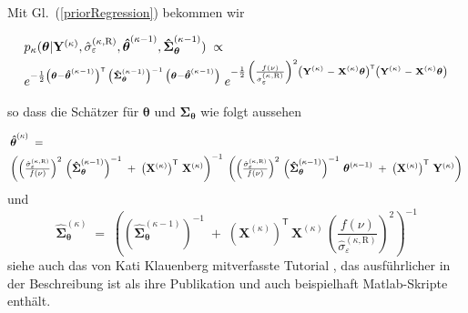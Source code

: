 Mit Gl.~(\ref{priorRegression}) bekommen wir
\begin{equation}
\arraycolsep=2.0pt\def\arraystretch{2.0}
\begin{array}{l}
p_{\kappa}(\boldsymbol{\theta}| \mathbf{Y}^{(\kappa)}, \hat \sigma_{\varepsilon}^{(\kappa,\mathrm{R})},  \boldsymbol{\hat \theta}^{(\kappa-1)},  \boldsymbol{\hat \Sigma}^{(\kappa-1)}_{\boldsymbol{\theta}}) \; \propto \\
e^{-\frac{1}{2}
	\left(\boldsymbol{\theta} - \boldsymbol{\hat \theta}^{(\kappa-1)} \right)^\mathsf{T} \,
	\left(\boldsymbol{\hat \Sigma}_{\boldsymbol{\theta}}^{(\kappa-1)}\right)^{-1} \, \left(\boldsymbol{\theta} - \boldsymbol{\hat \theta}^{(\kappa-1)} \right)} \;
e^{- \frac{1}{2} \, \left(\frac{f(\nu)}{\hat \sigma_{\varepsilon}^{(\kappa,\mathrm{R})}}\right)^2
	\left(\mathbf{Y}^{(\kappa)} \; - \;  \mathbf{X}^{(\kappa)} \boldsymbol{\theta} \right)^\mathsf{T}
	\left(\mathbf{Y}^{(\kappa)} \; - \;  \mathbf{X}^{(\kappa)} \boldsymbol{\theta} \right)}
\end{array}
\end{equation}
so dass die Schätzer für $\boldsymbol{\theta}$ und $\boldsymbol{\Sigma}_{\boldsymbol{\theta}}$
wie folgt aussehen
\begin{equation}
\arraycolsep=2.0pt\def\arraystretch{2.0}
\begin{array}{l}
\boldsymbol{\hat \theta}^{(\kappa)} \; = \; \\
\left(
\left(\frac{\hat \sigma_{\varepsilon}^{(\kappa,\mathrm{R})}}{f(\nu)}\right)^2 \,
\left(\boldsymbol{\hat \Sigma}_{\boldsymbol{\theta}}^{(\kappa-1)}\right)^{-1}
\; + \;
\left(\mathbf{X}^{(\kappa)}\right)^\mathsf{T} \, \mathbf{X}^{(\kappa)}
\right)^{-1} \;
\left(
\left( \frac{\hat \sigma_{\varepsilon}^{(\kappa,\mathrm{R})}}{f(\nu)}\right)^2 \,
\left(\boldsymbol{\hat \Sigma}_{\boldsymbol{\theta}}^{(\kappa-1)}\right)^{-1} \,
\boldsymbol{\theta}^{(\kappa-1)} \; + \;
\left(\mathbf{X}^{(\kappa)}\right)^\mathsf{T} \, \mathbf{Y}^{(\kappa)} \right)
\end{array}
\end{equation}
und
\begin{equation}
\boldsymbol{\hat \Sigma}_{\boldsymbol{\theta}}^{(\kappa)} \; = \;
\left(
\left(\boldsymbol{\hat \Sigma}_{\boldsymbol{\theta}}^{(\kappa-1)}\right)^{-1}
\; + \;
\left(\mathbf{X}^{(\kappa)}\right)^\mathsf{T} \, \mathbf{X}^{(\kappa)}  \,
\left(\frac{f(\nu)}{\hat \sigma_{\varepsilon}^{(\kappa,\mathrm{R})}}\right)^2
\right)^{-1}
\end{equation}
siehe auch das von Kati Klauenberg mitverfasste Tutorial \cite{Els15}, das ausführlicher
in der Beschreibung ist als ihre Publikation \cite{Kla15} und auch
beispielhaft Matlab-Skripte enthält.

